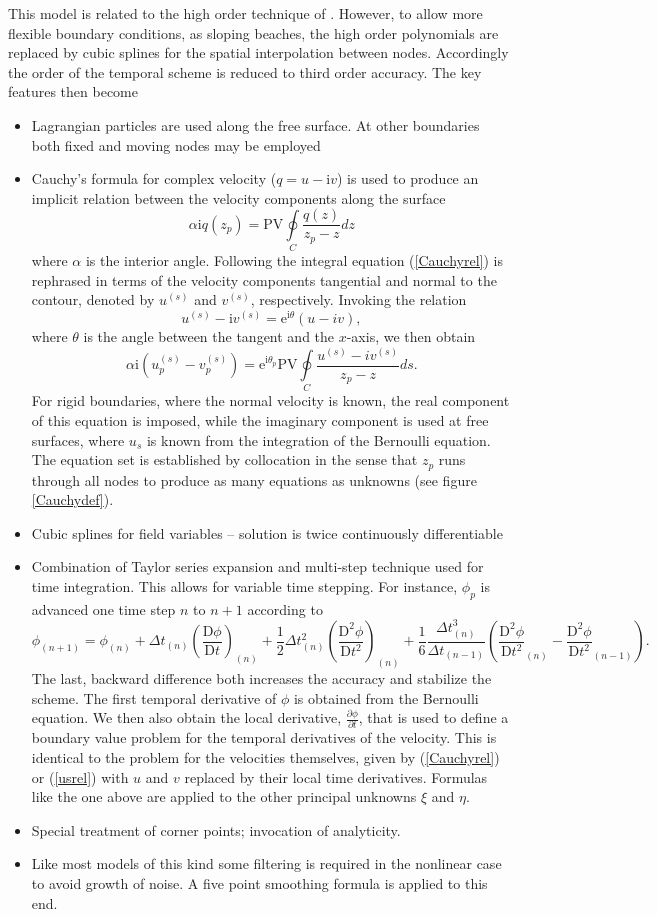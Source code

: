 \documentclass[11pt]{article}
\newcommand{\Mder}[1]{\frac{{\mathrm D}#1}{{\mathrm D}t} }
\newcommand{\half}{\frac{1}{2}}
\newcommand{\sixth}{\frac{1}{6}}
\newcommand{\beq}{\begin{equation}}
\newcommand{\eeq}{\end{equation}}
\newcommand{\der}[2]{\frac{\partial #1}{\partial #2}}
\newcommand{\numm}[1]{(\ref{#1})}
\newcommand{\imunit}{{\mathrm i}}
\newcommand{\us}{u^{(s)}}
\newcommand{\vs}{v^{(s)}}
\newcommand{\dt}{\Delta t}
\newcommand{\Mdto}[1]{\frac{{\mathrm D}^2#1}{{\mathrm D}t^2} }
\begin{document}
This model is related to the high order technique of  
\cite{Dold:1992}. However, to allow more flexible boundary conditions, 
as sloping beaches, the high order polynomials are replaced by cubic splines 
for the spatial interpolation between nodes. Accordingly the order of the 
temporal scheme is reduced to third order accuracy. 
 The key features then become
\begin{itemize}
\item Lagrangian particles are used along the free surface. At other 
boundaries both fixed and moving nodes may be employed
\item Cauchy's formula for complex velocity ($q=u-\imunit v$) is used to produce an implicit relation between the velocity components along the surface
\beq
\label{Cauchyrel} \alpha \imunit q(z_p)=\mathrm{PV} \oint\limits_C \frac{q(z)}{z_p-z}dz
\eeq
where $\alpha$ is the interior angle. 
Following \cite{Dold:1992} the integral equation \numm{Cauchyrel} is rephrased
in terms of the velocity components tangential and normal to the contour,
denoted by $\us$ and $\vs$, respectively. Invoking the relation 
\[\us-\imunit \vs =\mathrm{e}^{\imunit\theta}(u-iv),\]
where $\theta$ is the angle between the tangent and the $x$-axis,
we then obtain 
\beq
\label{usrel} \alpha \imunit (\us_p -\vs_p)=\mathrm{e}^{\imunit\theta_p}\mathrm{PV} \oint\limits_C \frac{\us-i\vs}{z_p-z}ds.
\eeq
For rigid boundaries, where the normal velocity is known, the real component
of this equation is imposed, while the imaginary component is used at free surfaces, where $u_s$ is known from the integration of the Bernoulli equation.
The equation set is established by
collocation in the sense that $z_p$ runs through all nodes to produce
as many equations as unknowns (see figure \ref{Cauchydef}). 
\item Cubic splines for field variables -- solution is twice continuously
differentiable
\item Combination of Taylor series expansion and multi-step
technique used for time integration. This allows for variable time stepping.
For instance, $\phi_p$ is advanced one time step $n$ to $n+1$ according to
\[\phi_{(n+1)}=\phi_{(n)}+\dt_{(n)}\left(\Mder\phi\right)_{(n)} +\half\dt_{(n)}^2\left(\Mdto\phi\right)_{(n)}+\sixth\frac{\dt_{(n)}^3}{\dt_{(n-1)}}\left(\Mdto\phi_{(n)}-{\Mdto\phi}_{(n-1)}\right).\]
The last, backward difference both increases the accuracy and stabilize the
scheme. The first temporal derivative of $\phi$ is obtained from the Bernoulli
equation. We then also obtain the local derivative, $\der\phi t$,
that is used to define a boundary value problem for the temporal derivatives
of the velocity. This is identical to the problem for the velocities 
themselves, given by \numm{Cauchyrel} or \numm{usrel} with $u$ and $v$
replaced by their local time derivatives. Formulas like the one above
are applied to the other principal unknowns $\xi$ and $\eta$.  
\item   Special treatment of corner points; invocation of analyticity.
\item Like most models of this kind some filtering is required in the nonlinear
      case to avoid growth of noise. A five point smoothing formula is applied
to this end.
\end{itemize}
\end{document}

